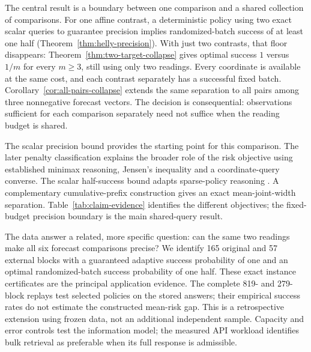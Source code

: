 \documentclass[12pt]{article}
\begin{document}
The central result is a boundary between one comparison and a shared
collection of comparisons. For one affine contrast, a deterministic policy
using two exact scalar queries to guarantee precision implies randomized-batch success of at least
one half (Theorem~\ref{thm:helly-precision}). With just two contrasts, that
floor disappears: Theorem~\ref{thm:two-target-collapse} gives optimal success
$1$ versus $1/m$ for every $m\geq3$, still using only two readings.
Every coordinate is available at the same cost, and each contrast separately
has a successful fixed batch. Corollary~\ref{cor:all-pairs-collapse} extends
the same separation to all pairs among three nonnegative forecast vectors.
The decision is consequential: observations sufficient for each comparison
separately need not suffice when the reading budget is shared.

The scalar precision bound provides the starting point for this comparison.
The later penalty classification explains the broader role of the risk
objective using established minimax reasoning, Jensen's inequality and a
coordinate-query converse. The scalar half-success bound adapts sparse-policy reasoning
\citep{kurtz2026}. A complementary cumulative-prefix construction gives an
exact mean-joint-width separation. Table~\ref{tab:claim-evidence} identifies
the different objectives; the fixed-budget precision boundary is the main
shared-query result.

The data answer a related, more specific question: can the same two readings
make all six forecast comparisons precise? We identify 165 original and 57
external blocks with a guaranteed adaptive success probability of one and
an optimal randomized-batch success probability of one half. These exact
instance certificates are the principal application evidence. The complete
819- and 279-block replays test selected policies on the stored answers;
their empirical success rates do not estimate the constructed mean-risk gap.
This is a retrospective extension using frozen data, not an additional
independent sample. Capacity and error controls test the information model;
the measured API workload identifies bulk retrieval as preferable when its
full response is admissible.
\end{document}
